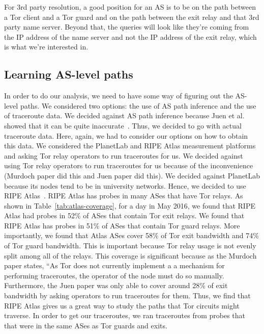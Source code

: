 For 3rd party resolution, a good position for an AS is to be on the path between 
a Tor client and a Tor guard and on the path between the exit relay and that 3rd party 
name server. Beyond that, the queries will look like they're coming from the IP address 
of the name server and not the IP address of the exit relay, which is what we're interested 
in.

\subsection{Learning AS-level paths}
In order to do our analysis, we need to have some way of figuring out the AS-level paths. 
We considered two options: the use of AS path inference and the use of traceroute data. 
We decided against AS path inference because Juen et al. showed that it can be quite
inaccurate~\cite{Juen2015a}.  Thus, we decided to go with actual traceroute data. Here,
again, we had to consider our options on how to obtain this data. We considered the
PlanetLab and RIPE Atlas measurement platforms and asking Tor relay operators to run
traceroutes for us.  We decided against using Tor relay operators to run traceroutes for
us because of the inconvenience (Murdoch paper did this and Juen paper did this). We
decided against PlanetLab because its nodes tend to be in university networks. Hence, we
decided to use RIPE Atlas~\cite{atlas}. RIPE Atlas has probes in many ASes that have Tor
relays. As shown in Table~\ref{tab:atlas-coverage}, for a day in May 2016, we found that
RIPE Atlas had probes in 52\% of ASes that contain Tor exit relays.  We found that RIPE
Atlas has probes in 51\% of ASes that contain Tor guard relays. More importantly, we found
that Atlas ASes cover 58\% of Tor exit bandwidth and 74\% of Tor guard bandwidth. This is
important because Tor relay usage is not evenly split among all of the relays. This
coverage is significant because as the Murdoch paper states, ``As Tor does not currently
implement a a mechanism for performing traceroutes, the operator of the node must do so
manually. Furthermore, the Juen paper was only able to cover around 28\% of exit bandwidth
by asking operators to run traceroutes for them.  Thus, we find that RIPE Atlas gives us a
great way to study the paths that Tor circuits might traverse. In order to get
our traceroutes, we ran traceroutes from probes that that were in the same ASes
as Tor guards and exits. 


